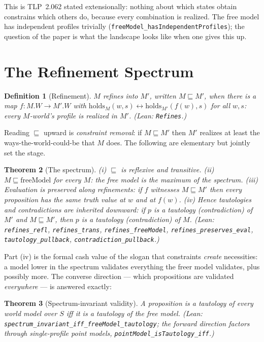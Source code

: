 \documentclass[10pt, letterpaper]{article}
\newtheorem{theorem}{Theorem}[section]
\newtheorem{definition}[theorem]{Definition}
\theoremstyle{remark}
\newcommand{\lean}[1]{\texttt{#1}}
\newcommand{\TLP}[1]{TLP~#1}
\begin{document}
This is \TLP{2.062} stated extensionally: nothing about which states obtain
constrains which others do, because every combination is realized. The free
model has independent profiles trivially
(\lean{freeModel\_hasIndependentProfiles}); the question of the paper is what
the landscape looks like when one gives this up.

\section{The Refinement Spectrum}\label{sec:spectrum}

\begin{definition}[Refinement]\label{def:refines}
$M$ \emph{refines into} $M'$, written $M \sqsubseteq M'$, when there is a map
$f : M.W \to M'.W$ with
$\mathrm{holds}_M(w, s) \leftrightarrow \mathrm{holds}_{M'}(f(w), s)$ for all
$w, s$: every $M$-world's profile is realized in $M'$. (Lean: \lean{Refines}.)
\end{definition}

Reading $\sqsubseteq$ upward is \emph{constraint removal}: if
$M \sqsubseteq M'$ then $M'$ realizes at least the ways-the-world-could-be
that $M$ does. The following are elementary but jointly set the stage.

\begin{theorem}[The spectrum]\label{thm:spectrum}
\emph{(i)} $\sqsubseteq$ is reflexive and transitive.
\emph{(ii)} $M \sqsubseteq \mathrm{freeModel}$ for every $M$: the free model
is the maximum of the spectrum.
\emph{(iii)} Evaluation is preserved along refinements: if $f$ witnesses
$M \sqsubseteq M'$ then every proposition has the same truth value at $w$ and
at $f(w)$.
\emph{(iv)} Hence tautologies and contradictions are inherited \emph{downward}:
if $p$ is a tautology (contradiction) of $M'$ and $M \sqsubseteq M'$, then $p$
is a tautology (contradiction) of $M$.
(Lean: \lean{refines\_refl}, \lean{refines\_trans}, \lean{refines\_freeModel},
\lean{refines\_preserves\_eval}, \lean{tautology\_pullback},
\lean{contradiction\_pullback}.)
\end{theorem}

Part (iv) is the formal cash value of the slogan that constraints
\emph{create} necessities: a model lower in the spectrum validates everything
the freer model validates, plus possibly more. The converse direction ---
which propositions are validated \emph{everywhere} --- is answered exactly:

\begin{theorem}[Spectrum-invariant validity]\label{thm:invariant}
A proposition is a tautology of every world model over $S$ iff it is a
tautology of the free model. (Lean:
\lean{spectrum\_invariant\_iff\_freeModel\_tautology}; the forward direction
factors through single-profile \emph{point models},
\lean{pointModel\_isTautology\_iff}.)
\end{theorem}
\end{document}
